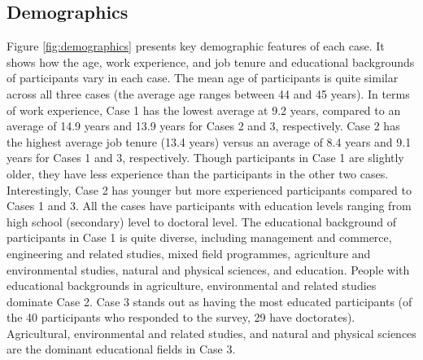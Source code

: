 \begin{table}[p]
\centering
{}
\end{table}

\subsection{Demographics}

Figure \ref{fig:demographics} presents key demographic features of each case. It shows how the age, work experience, and job tenure and educational backgrounds of participants vary in each case. The mean age of participants is quite similar across all three cases (the average age ranges between 44 and 45 years). In terms of work experience, Case 1 has the lowest average at 9.2 years, compared to an average of 14.9 years and 13.9 years for Cases 2 and 3, respectively. Case 2 has the highest average job tenure (13.4 years) versus an average of 8.4 years and 9.1 years for Cases 1 and 3, respectively. Though participants in Case 1 are slightly older, they have less experience than the participants in the other two cases. Interestingly, Case 2 has younger but more experienced participants compared to Cases 1 and 3. All the cases have participants with education levels ranging from high school (secondary) level to doctoral level. The educational background of participants in Case 1 is quite diverse, including management and commerce, engineering and related studies, mixed field programmes, agriculture and environmental studies, natural and physical sciences, and education. People with educational backgrounds in agriculture, environmental and related studies dominate Case 2. Case 3 stands out as having the most educated participants (of the 40 participants who responded to the survey, 29 have doctorates). Agricultural, environmental and related studies, and natural and physical sciences are the dominant educational fields in Case 3. \medskip

